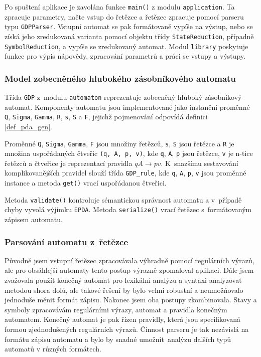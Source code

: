 Po spuštení aplikace je zavolána funkce \texttt{main()} z modulu \texttt{application}. Ta zpracuje parametry, načte vstup do řetězce a řetězec zpracuje pomocí parseru typu \texttt{GDPParser}. Vstupní automat se pak formátovaně vypíše na výstup, nebo se získá jeho zredukovaná varianta pomocí objektu třídy \texttt{StateReduction}, případně \texttt{SymbolReduction}, a vypíše se zredukovaný automat. Modul \texttt{library} poskytuje funkce pro výpis nápovědy, zpracování parametrů a práci se vstupy a výstupy.


\subsubsection{Model zobecněného hlubokého zásobníkového automatu}

Třída \texttt{GDP} z~modulu \texttt{automaton} reprezentuje zobecněný hluboký zásobníkový automat. Komponenty automatu jsou implementované jako instanční proměnné \texttt{Q}, \texttt{Sigma}, \texttt{Gamma}, \texttt{R}, \texttt{s}, \texttt{S} a \texttt{F}, jejichž pojmenování odpovídá definici \ref{def_pda_gen}. 

Proměnné \texttt{Q}, \texttt{Sigma}, \texttt{Gamma}, \texttt{F} jsou množiny řetězců, \texttt{s}, \texttt{S} jsou řetězce a \texttt{R} je množina uspořádaných čtveřic \texttt{(q, A, p, v)}, kde \texttt{q}, \texttt{A}, \texttt{p} jsou řetězce, \texttt{v} je n-tice řetězců a čtveřice je reprezentací pravidla $qA \rightarrow pv$. 
K~snazšímu sestavování komplikovanějších pravidel slouží třída \texttt{GDP\_rule}, kde \texttt{q}, \texttt{A}, \texttt{p}, \texttt{v} jsou proměnné instance a metoda \texttt{get()} vrací uspořádanou čtveřici.

Metoda \texttt{validate()} kontroluje sémantickou správnost automatu a v~případě chyby vyvolá výjimku \texttt{EPDA}. Metoda \texttt{serialize()} vrací řetězec s~formátovaným zápisem automatu.

\subsubsection{Parsování automatu z~řetězce}

Původně jsem vstupní řetězec zpracovávala výhradně pomocí regulárních výrazů, ale pro obsáhlejší automaty tento postup výrazně zpomaloval aplikaci. Dále jsem zvažovala použít konečný automat pro lexikální analýzu a syntaxi analyzovat metodou shora dolů, ale takové řešení by bylo velmi robustní a neumožňovalo jednoduše měnit formát zápisu. Nakonec jsem oba postupy zkombinovala. Stavy a symboly zpracovávám regulárními výrazy, automat a pravidla konečným automatem. Konečný automat je pak řízen pravidly, která jsou specifikovaná formou zjednodušených regulárních výrazů. Činnost parseru je tak nezávislá na formátu zápisu automatu a bylo by snadné umožnit~analýzu dalších typů automatů v různých formátech.

